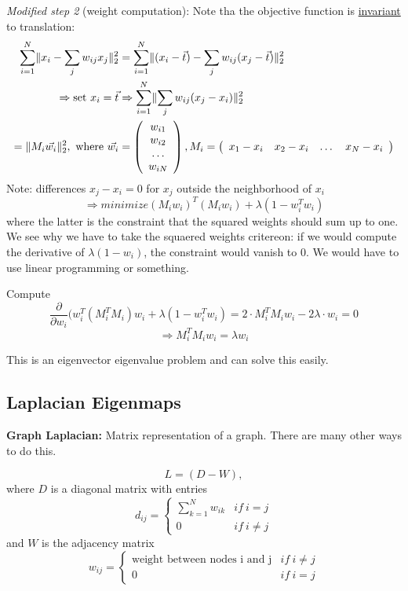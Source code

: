 \documentclass{scrartcl}
\DeclarePairedDelimiter\norm{\lVert}{\rVert}%
\begin{document}
\textit{Modified step 2} (weight computation): Note tha the objective function is \underline{invariant} to translation: 
\begin{align*}
    \sum_{i=1}^N \norm{x_i - \sum_j w_{ij} x_j}_2^2 &= \sum_{i=1}^N \norm{(x_i - \vec{t}) - \sum_j w_{ij} (x_j - \vec{t})}_2^2\\
    \Rightarrow \text{set } x_i = \vec{t} & \Rightarrow 
\sum_{i=1}^N \norm{\sum_j w_{ij} (x_j - x_i)}_2^2\\
    = \norm{M_i\vec{w_i}}_2^2, \text{ where } 
    \vec{w_i} &= \left( \begin{array}{c} w_{i1} \\ w_{i2} \\ \dots \\ w_{iN} \end{array} \right)
   , M_i = \left(\begin{array}{cccc} x_1 - x_i & x_2 - x_i& \dots& x_N - x_i \end{array}\right)\\
\end{align*}
Note: differences \(x_j - x_i = 0\) for \(x_j\) outside the neighborhood of \(x_i\)
\[\Rightarrow minimize (M_i w_i)^T (M_i w_i) + \lambda(1-w_i^T w_i)\]
where the latter is the constraint that the squared weights should sum up to one. We see why we have to take the squaered weights critereon: if we would compute the derivative of \(\lambda(1-w_i)\), the constraint would vanish to \(0\). We would have to use linear programming or something.

Compute 
\[\frac{\partial}{\partial w_i} (w_i^T (M_i^T M_i) w_i + \lambda(1-w_i^T w_i)=  2 \cdot M_i^T M_i w_i - 2 \lambda  \cdot w_i = 0\]
\[\Rightarrow M_i^T M_i w_i = \lambda w_i\]

This is an eigenvector eigenvalue problem and can solve this easily.



\subsection{Laplacian Eigenmaps}
\textbf{Graph Laplacian:} Matrix representation of a graph. There are many other ways to do this.

\[L = (D - W), \]
where \(D\) is a diagonal matrix with entries \[d_{ij} = \begin{cases} \sum_{k=1}^N w_{ik} & if \ i=j \\ 0 & if \ i \neq j \end{cases}\] and \(W\) is the adjacency matrix \[w_{ij} = \begin{cases} \text{weight between nodes i and j} & if \ i\neq j \\ 0 & if \ i = j\end{cases}\]
\end{document}
